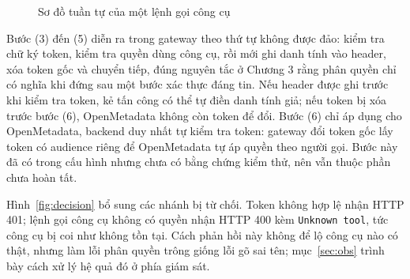 \begin{figure}[!htb]\centering
{}
\caption{Sơ đồ tuần tự của một lệnh gọi công cụ}\label{fig:seq}\end{figure}

Bước (3) đến (5) diễn ra trong gateway theo thứ tự không được đảo: kiểm tra chữ ký token, kiểm tra quyền dùng công cụ, rồi mới ghi danh tính vào header, xóa token gốc và chuyển tiếp, đúng nguyên tắc ở Chương 3 rằng phân quyền chỉ có nghĩa khi đứng sau một bước xác thực đáng tin. Nếu header được ghi trước khi kiểm tra token, kẻ tấn công có thể tự điền danh tính giả; nếu token bị xóa trước bước (6), OpenMetadata không còn token để đổi. Bước (6) chỉ áp dụng cho OpenMetadata, backend duy nhất tự kiểm tra token: gateway đổi token gốc lấy token có audience riêng để OpenMetadata tự áp quyền theo người gọi. Bước này đã có trong cấu hình nhưng chưa có bằng chứng kiểm thử, nên vẫn thuộc phần chưa hoàn tất.

Hình~\ref{fig:decision} bổ sung các nhánh bị từ chối. Token không hợp lệ nhận HTTP 401; lệnh gọi công cụ không có quyền nhận HTTP 400 kèm \texttt{Unknown tool}, tức công cụ bị coi như không tồn tại. Cách phản hồi này không để lộ công cụ nào có thật, nhưng làm lỗi phân quyền trông giống lỗi gõ sai tên; mục~\ref{sec:obs} trình bày cách xử lý hệ quả đó ở phía giám sát.

